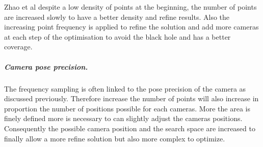 Zhao et al \citep{22*zhao2008}  despite a low density of points at the beginning, the number of points are increased slowly to have a better density and refine results. Also the increasing point frequency   is applied to refine the solution and add more cameras at each step of the optimisation to avoid the black hole and has a better coverage.  \\


\subparagraph{Camera pose precision.}
The frequency sampling is often linked to the pose precision of the camera as discussed previously. %
Therefore increase the number of points will also increase in proportion the number of positions possible for each cameras. More the area is finely defined more is necessary to can slightly adjust the cameras positions. Consequently the possible camera position and the search space are increased to finally allow a more refine solution but also more complex to optimize.


